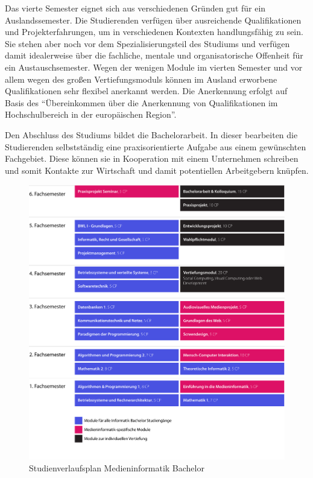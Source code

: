 Das vierte Semester eignet sich aus verschiedenen Gründen gut für ein
Auslandssemester. Die Studierenden verfügen über ausreichende
Qualifikationen und Projekterfahrungen, um in verschiedenen Kontexten
handlungsfähig zu sein. Sie stehen aber noch vor dem
Spezialisierungsteil des Studiums und verfügen damit idealerweise über
die fachliche, mentale und organisatorische Offenheit für ein
Austauschsemester. Wegen der wenigen Module im vierten Semester und vor
allem wegen des großen Vertiefungsmoduls können im Ausland erworbene
Qualifikationen sehr flexibel anerkannt werden. Die Anerkennung erfolgt
auf Basis des ``Übereinkommen über die Anerkennung von Qualifikationen
im Hochschulbereich in der europäischen Region''.

Den Abschluss des Studiums bildet die Bachelorarbeit. In dieser
bearbeiten die Studierenden selbstständig eine praxisorientierte Aufgabe
aus einem gewünschten Fachgebiet. Diese können sie in Kooperation mit
einem Unternehmen schreiben und somit Kontakte zur Wirtschaft und damit
potentiellen Arbeitgebern knüpfen.

\begin{figure}[htbp]
\centering
\includegraphics[width=\textwidth]{../anhaenge/bilder/studienverlaufsplan-mi-bachelor.png}
\caption{Studienverlaufsplan Medieninformatik Bachelor}
\end{figure}

